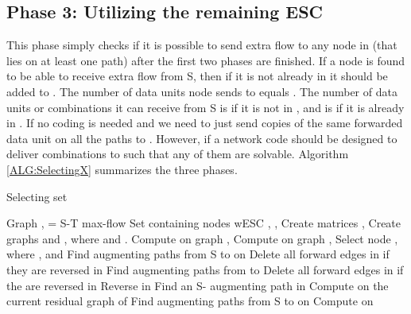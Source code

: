 \documentclass[conference]{IEEEtran}
\begin{document}
\subsection{Phase 3: Utilizing the remaining ESC}

This phase simply checks if it is possible to send extra flow to any node in  (that lies on at least one path) after the first two phases are finished. If a node  is found to be able to receive extra flow  from S, then if it is not already in  it should be added to . The number of data units node  sends to  equals . The number of data units or combinations it can receive from S is  if it is not in , and is  if it is already in . If  no coding is needed and we need to just send copies of the same forwarded data unit on all the paths to . However, if  a network code should be designed to deliver  combinations to  such that any  of them are solvable. Algorithm \ref{ALG:SelectingX} summarizes the three phases. 



\begin{algorithm}[!t]
\small
\caption{Selecting set }
\label{ALG:SelectingX}
\begin{algorithmic}[1]
\REQUIRE Graph ,  = S-T max-flow
\ENSURE Set  containing nodes wESC 
\STATE , ,  
\STATE Create matrices ,  
\STATE {}
\STATE Create graphs  and , where  and . 
\WHILE{()}
\STATE Compute  on graph , 
\STATE Compute  on graph , 
\STATE Select node , where , and 
\STATE 
\ELSE
\STATE Find  augmenting paths from S to  on 
\STATE Delete all forward edges in  if they are reversed in 
\STATE Find  augmenting paths from  to 
\STATE Delete all forward edges in  if the are reversed in  
\STATE 
\STATE 
\STATE 
\STATE 
\ENDIF
\ENDWHILE
\FORALL{()}
\IF {()}
\STATE Reverse  in 
\ENDIF
\ENDFOR
\STATE  {}
\WHILE {()}
\IF{()}
\STATE 
\ELSE
\STATE Find an S- augmenting path in 
\STATE  
\ENDIF
\ENDWHILE
\STATE  {}
\FORALL {()}
\STATE Compute  on the current residual graph of 
\IF {()}
\STATE Find  augmenting paths from S to  on 
\STATE 
\ENDIF
\IF {()}
\STATE Compute  on 
\STATE 
\STATE 
\ENDIF
\ENDFOR
\RETURN 
\end{algorithmic}
\end{algorithm}
\end{document}
